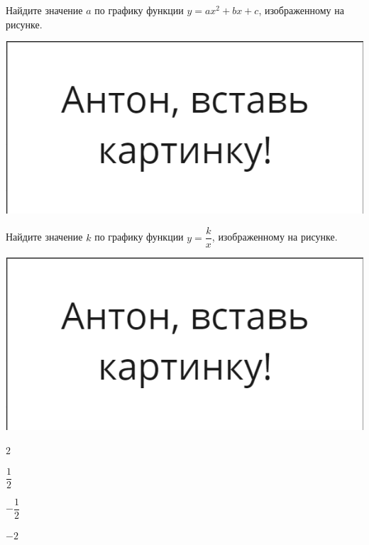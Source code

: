 \begin{class}[number=3]
	\begin{listofex}
			\item 
			\begin{minipage}[t]{0.57\textwidth}
				Найдите значение \( a \) по графику функции \( y=ax^2+bx+c \), изображенному на рисунке.
			\end{minipage}
			\begin{minipage}[c]{0.3\textwidth}
				\includegraphics[align=t, width=\textwidth]{pics/G91M4L4-1}
			\end{minipage}
		
				\item 
			\begin{minipage}[t]{0.57\textwidth}
				Найдите значение \( k \) по графику функции \( y=\dfrac{k}{x} \), изображенному на рисунке.
			\end{minipage}
			\begin{minipage}[c]{0.3\textwidth}
			\includegraphics[align=t, width=\textwidth]{pics/G91M4L4-1}
		\end{minipage}
		\begin{enumcols}[itemcolumns=4]
			\item \( 2 \)
			\item \( \dfrac{1}{2} \)
			\item \( -\dfrac{1}{2} \)
			\item \( -2 \)
		\end{enumcols}
	

\end{listofex}
\end{class}

